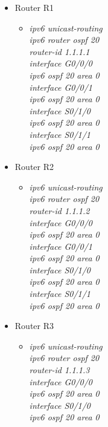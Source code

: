 \documentclass[12pt,a4paper]{report}
\begin{document}
\begin{itemize}
\begin{itemize}
\begin{itemize}
          \end{itemize}
            \item Router R1
           
        \begin{itemize}
         \item \textit{ipv6 unicast-routing\\
ipv6 router ospf 20\\
router-id 1.1.1.1\\
interface G0/0/0\\
ipv6 ospf 20 area 0\\
interface G0/0/1\\
ipv6 ospf 20 area 0\\
interface S0/1/0\\
ipv6 ospf 20 area 0\\
interface S0/1/1\\
ipv6 ospf 20 area 0\\}
        
          \end{itemize}
             \item Router R2
           
        \begin{itemize}
         \item \textit{ipv6 unicast-routing\\
ipv6 router ospf 20\\
router-id 1.1.1.2\\
interface G0/0/0\\
ipv6 ospf 20 area 0\\
interface G0/0/1\\
ipv6 ospf 20 area 0\\
interface S0/1/0\\
ipv6 ospf 20 area 0\\
interface S0/1/1\\
ipv6 ospf 20 area 0\\}
        
          \end{itemize}
             \item Router R3
           
        \begin{itemize}
         \item \textit{ipv6 unicast-routing\\
ipv6 router ospf 20\\
router-id 1.1.1.3\\
interface G0/0/0\\
ipv6 ospf 20 area 0\\
interface S0/1/0\\
ipv6 ospf 20 area 0\\}
        

\end{itemize}
\end{itemize}
\end{itemize}
\end{document}
